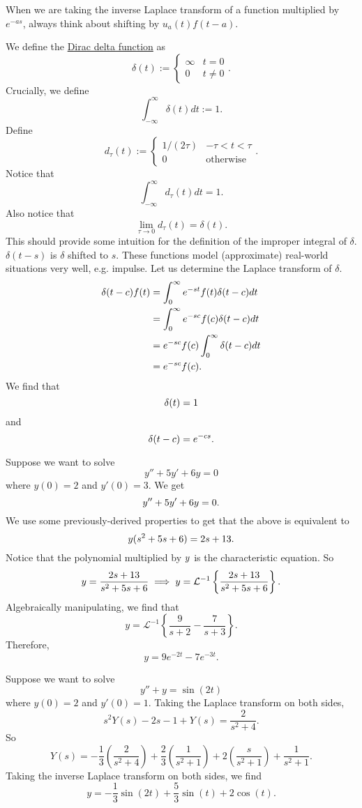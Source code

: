 \documentclass[11pt, oneside]{article}   	%
\let\L\relax
\newcommand{\L}[1]{\mathcal{L}\left\{#1\right\}}
\newcommand{\Li}[1]{\mathcal{L}^{-1}\left\{#1\right\}}
\begin{document}
When we are taking the inverse Laplace transform of a function multiplied by $e^{-as}$, always think about shifting by $u_a(t)f(t-a)$.

We define the \underline{Dirac delta function} as
$$
\delta(t) := 
\begin{cases}
\infty & t = 0 \\
0 & t \neq 0
\end{cases}.
$$
Crucially, we define
$$
\int_{-\infty}^\infty \delta(t) dt := 1.
$$
Define
$$
d_\tau (t) := \begin{cases}
1/(2\tau) & -\tau<t<\tau \\
0 & \textrm{otherwise}
\end{cases}.
$$
Notice that
$$
\int_{-\infty}^\infty d_\tau(t)dt = 1.
$$
Also notice that
$$
\lim_{\tau\to 0} d_\tau (t) = \delta(t).
$$
This should provide some intuition for the definition of the improper integral of $\delta$. $\delta(t-s)$ is $\delta $ shifted to $s$. These functions model (approximate) real-world situations very well, e.g. impulse. Let us determine the Laplace transform of $\delta$.
\begin{align*}
\L{\delta(t-c)f(t)}  	&=  \int_0^\infty e^{-st}f(t)\delta(t-c)dt\\
				&=  \int_0^\infty e^{-sc}f(c)\delta(t-c)dt\\
				&=  e^{-sc}f(c) \int_0^\infty\delta(t-c)dt\\
				&= e^{-sc}f(c).
\end{align*}
We find that
$$
\L{\delta(t)} = 1
$$
and
$$
\L{\delta(t-c)} = e^{-cs}.
$$

Suppose we want to solve
$$
y'' + 5y' + 6y = 0
$$ 
where $y(0)=2$ and $y'(0)=3$. We get
$$
\L{y''} + 5\L{y'} + 6\L{y} = 0.
$$
We use some previously-derived properties to get that the above is equivalent to
$$
\L{y}(s^2 + 5s + 6) = 2s + 13.
$$
Notice that the polynomial multiplied by $\L{y}$ is the characteristic equation. So 
$$
\L{y} = \frac{2s+13}{s^2 +5s+6} \implies y = \Li{ \frac{2s+13}{s^2 +5s+6} }.
$$
Algebraically manipulating, we find that
$$
y = \Li{ \frac{9}{s + 2} - \frac{7}{s + 3} }.
$$
Therefore, 
$$
y = 9e^{-2t} - 7e^{-3t}.
$$

Suppose we want to solve
$$
y'' + y = \sin(2t)
$$
where $y(0) = 2$ and $y'(0) = 1$. Taking the Laplace transform on both sides,
$$
s^2Y(s) - 2s -1 + Y(s)=  \frac{2}{s^2+4}.
$$
So
$$
Y(s) = -\frac{1}{3}\left( \frac{2}{s^2 + 4} \right) +\frac{2}{3}\left( \frac{1}{s^2 + 1} \right) + 2\left(\frac{s}{s^2+1}\right) + \frac{1}{s^2+1}.
$$
Taking the inverse Laplace transform on both sides, we find
$$
y = -\frac{1}{3}\sin(2t) +  \frac{5}{3}\sin (t) + 2\cos(t).
$$
\end{document}
